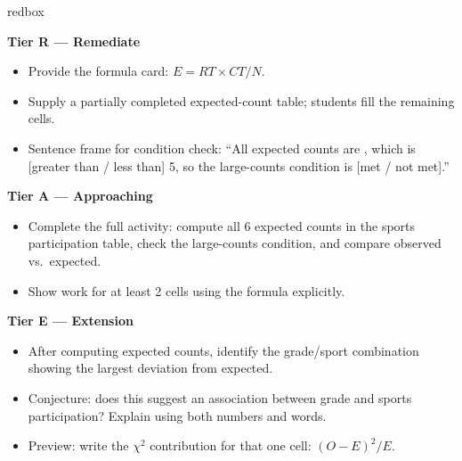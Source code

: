\documentclass[10pt]{article}
\begin{document}
\begin{skillbox}{redbox}
\begin{minipage}[t]{0.30\linewidth}
    \textbf{Tier R --- Remediate}
    \begin{itemize}
        \item Provide the formula card: $E = RT \times CT / N$.
        \item Supply a partially completed expected-count table; students fill the
              remaining cells.
        \item Sentence frame for condition check: ``All expected counts are
              \underline{\hspace{1cm}}, which is [greater than / less than] 5, so
              the large-counts condition is [met / not met].''
    \end{itemize}
\end{minipage}
\hfill
\begin{minipage}[t]{0.30\linewidth}
    \textbf{Tier A --- Approaching}
    \begin{itemize}
        \item Complete the full activity: compute all 6 expected counts in the sports
              participation table, check the large-counts condition, and compare observed
              vs.\ expected.
        \item Show work for at least 2 cells using the formula explicitly.
    \end{itemize}
\end{minipage}
\hfill
\begin{minipage}[t]{0.30\linewidth}
    \textbf{Tier E --- Extension}
    \begin{itemize}
        \item After computing expected counts, identify the grade/sport combination
              showing the largest deviation from expected.
        \item Conjecture: does this suggest an association between grade and sports
              participation? Explain using both numbers and words.
        \item Preview: write the $\chi^2$ contribution for that one cell:
              $(O - E)^2 / E$.
    \end{itemize}
\end{minipage}
\end{skillbox}
\end{document}
